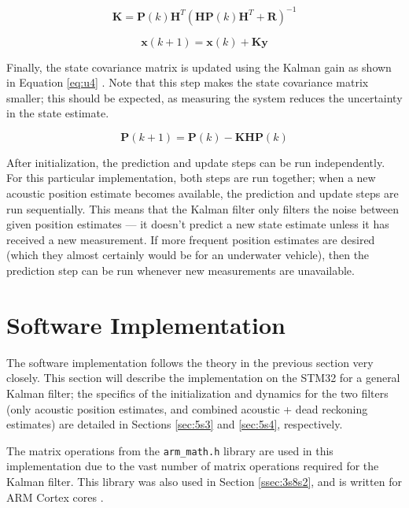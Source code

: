 \documentclass[11pt]{ucthesisCP}
\begin{document}
\begin{equation} \label{eq:u2}
	\mathbf{K} = \mathbf{P}(k) \mathbf{H}^T (\mathbf{H} \mathbf{P}(k) \mathbf{H}^T + \mathbf{R})^{-1} 
\end{equation}

\begin{equation} \label{eq:u3}
	\mathbf{x}(k+1) = \mathbf{x}(k) + \mathbf{K} \mathbf{y}
\end{equation}

Finally, the state covariance matrix is updated using the Kalman gain as shown in Equation \ref{eq:u4} \cite{kfsimply}. Note that this step makes the state covariance matrix smaller; this should be expected, as measuring the system reduces the uncertainty in the state estimate.

\begin{equation} \label{eq:u4}
	\mathbf{P}(k+1) = \mathbf{P}(k) - \mathbf{K} \mathbf{H} \mathbf{P}(k)
\end{equation}

After initialization, the prediction and update steps can be run independently. For this particular implementation, both steps are run together; when a new acoustic position estimate becomes available, the prediction and update steps are run sequentially. This means that the Kalman filter only filters the noise between given position estimates --- it doesn’t predict a new state estimate unless it has received a new measurement. If more frequent position estimates are desired (which they almost certainly would be for an underwater vehicle), then the prediction step can be run whenever new measurements are unavailable.

\section{Software Implementation} \label{sec:5s2}
The software implementation follows the theory in the previous section very closely. This section will describe the implementation on the STM32 for a general Kalman filter; the specifics of the initialization and dynamics for the two filters (only acoustic position estimates, and combined acoustic + dead reckoning estimates) are detailed in Sections \ref{sec:5s3} and \ref{sec:5s4}, respectively.

The matrix operations from the \verb|arm_math.h| library are used in this implementation due to the vast number of matrix operations required for the Kalman filter. This library was also used in Section \ref{ssec:3s8s2}, and is written for ARM Cortex cores \cite{arm}.
\end{document}
